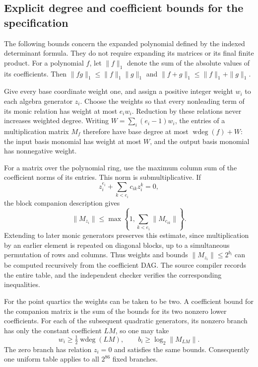 \subsection{Explicit degree and coefficient bounds for the specification}
\label{subsec:finite-algebra-bounds}

The following bounds concern the expanded polynomial defined by the
indexed determinant formula. They do not require expanding its matrices
or its final finite product. For a polynomial $f$, let $\|f\|_1$ denote
the sum of the absolute values of its coefficients. Then
$\|fg\|_1\le\|f\|_1\|g\|_1$ and
$\|f+g\|_1\le\|f\|_1+\|g\|_1$.

Give every base coordinate weight one, and assign a positive integer
weight $w_i$ to each algebra generator $z_i$. Choose the weights so that
every nonleading term of its monic relation has weight at most
$e_iw_i$. Reduction by these relations never increases weighted degree.
Writing $W=\sum_i(e_i-1)w_i$, the entries of a multiplication matrix
$M_f$ therefore have base degree at most $\operatorname{wdeg}(f)+W$:
the input basis monomial has weight at most $W$, and the output basis
monomial has nonnegative weight.

For a matrix over the polynomial ring, use the maximum column sum of
the coefficient norms of its entries. This norm is submultiplicative.
If
\[
 z_i^{e_i}+\sum_{k<e_i}c_{ik}z_i^k=0,
\]
the block companion description gives
\[
 \|M_{z_i}\|\le
 \max\left\{1,\sum_{k<e_i}\|M_{c_{ik}}\|\right\}.
\]
Extending to later monic generators preserves this estimate, since
multiplication by an earlier element is repeated on diagonal blocks,
up to a simultaneous permutation of rows and columns. Thus weights
and bounds $\|M_{z_i}\|\le2^{b_i}$ can be computed recursively from
the coefficient DAG. The source compiler records the entire table,
and the independent checker verifies the corresponding inequalities.

For the point quartics the weights can be taken to be two. A coefficient
bound for the companion matrix is the sum of the bounds for its two
nonzero lower coefficients. For each of the subsequent quadratic
generators, its nonzero branch has only the constant coefficient
$LM$, so one may take
\[
 w_i\ge\tfrac12\operatorname{wdeg}(LM),\qquad
 b_i\ge\log_2\|M_{LM}\|.
\]
The zero branch has relation $z_i=0$ and satisfies the same bounds.
Consequently one uniform table applies to all $2^{86}$ fixed branches.

